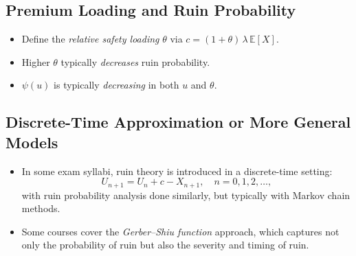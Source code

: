 \documentclass[13pt,a4paper]{article}
\begin{document}
\subsection{Premium Loading and Ruin Probability}
\begin{itemize}
  \item Define the \emph{relative safety loading} \(\theta\) via \(c = (1+\theta)\,\lambda\,\mathbb{E}[X]\).
  \item Higher \(\theta\) typically \emph{decreases} ruin probability.
  \item \(\psi(u)\) is typically \emph{decreasing} in both \(u\) and \(\theta\).
\end{itemize}

\subsection{Discrete-Time Approximation or More General Models}
\begin{itemize}
  \item In some exam syllabi, ruin theory is introduced in a discrete-time setting: 
  \[
    U_{n+1} = U_n + c - X_{n+1}, \quad n=0,1,2,\dots,
  \]
  with ruin probability analysis done similarly, but typically with Markov chain methods.
  \item Some courses cover the \emph{Gerber--Shiu function} approach, which captures not only the probability of ruin but also the severity and timing of ruin.
\end{itemize}
\end{document}
